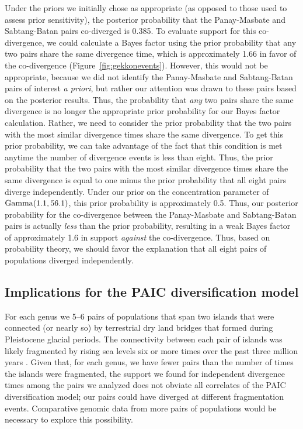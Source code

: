 Under the priors we initially chose as appropriate (as opposed to those used to
assess prior sensitivity), the posterior probability that the Panay-Masbate and
Sabtang-Batan pairs co-diverged is 0.385.
To evaluate support for this co-divergence, we could calculate a Bayes factor
using the prior probability that any two pairs share the same divergence time,
which is approximately 1.66 in favor of the co-divergence
(Figure~\ref{fig:gekkonevents}).
However, this would not be appropriate, because we did not identify the
Panay-Masbate and Sabtang-Batan pairs of interest \emph{a priori},
but rather our attention was drawn to these pairs based on the posterior
results.
Thus, the probability that \emph{any} two pairs share the same divergence
is no longer the appropriate prior probability for our Bayes factor calculation.
Rather, we need to consider the prior probability that the two pairs with
the most similar divergence times share the same divergence.
To get this prior probability, we can take advantage of the fact that this
condition is met anytime the number of divergence events is less than eight.
Thus, the prior probability that the two pairs with the most similar divergence
times share the same divergence is equal to one minus the prior probability
that all eight pairs diverge independently.
Under our prior on the concentration parameter of $\textrm{Gamma}(1.1, 56.1)$,
this prior probability is approximately 0.5.
Thus, our posterior probability for the co-divergence between the Panay-Masbate
and Sabtang-Batan pairs is actually \emph{less} than the prior probability,
resulting in a weak Bayes factor of approximately 1.6 in support \emph{against}
the co-divergence.
Thus, based on probability theory, we should favor the explanation that all
eight pairs of  populations diverged independently.

\subsection{Implications for the PAIC diversification model}

For each genus we 5--6 pairs of populations that span two islands that were
connected (or nearly so) by terrestrial dry land bridges that formed during
Pleistocene glacial periods.
The connectivity between each pair of islands was likely fragmented by rising
sea levels six or more times over the past three million years
\citep{Rohling1998,Siddall2003}.
Given that, for each genus, we have fewer pairs than the number of times the
islands were fragmented,
the support we found for independent divergence times among the pairs we
analyzed does not obviate all correlates of the PAIC diversification model;
our pairs could have diverged at different fragmentation events.
Comparative genomic data from more pairs of populations would be necessary to
explore this possibility.

